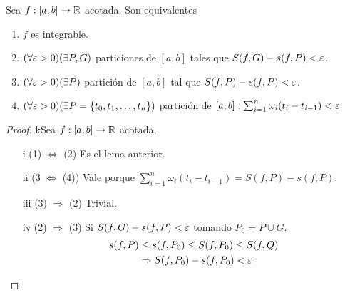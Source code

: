 \begin{theorem}
  Sea \(f: [a, b] \to \mathbb{R} \) acotada. Son equivalentes \begin{enumerate}
    \item \(f\) es integrable.
    \item \((\forall \varepsilon > 0)(\exists P, G)\) particiones de \([a, b]\) tales que \(S(f, G) - s(f, P) < \varepsilon \).
    \item \((\forall \varepsilon > 0)(\exists P)\) partición de \([a, b]\) tal que \(S(f, P) - s(f, P) < \varepsilon \).
    \item \((\forall \varepsilon > 0)(\exists P = \{ t_0, t_1, \ldots, t_n \})\) partición de \([a, b] : \sum_{i = 1}^n \omega_i (t_i - t_{i-1}) < \varepsilon \)
  \end{enumerate}

  \begin{proof}
    kSea \(f: [a,b] \to \mathbb{R} \) acotada,
    \begin{enumerate}
      \item[i] (1) \(\iff \) (2) Es el lema anterior.
      \item[ii] (3 \(\iff \) (4)) Vale porque \(\sum_{i = 1}^n \omega_i (t_i - t_{i-1}) = S(f, P) - s(f, P)\).
      \item[iii] (3) \(\Rightarrow \) (2) Trivial.
      \item[iv] (2) \(\Rightarrow \) (3) Si \(S(f, G) - s(f, P) < \varepsilon \) tomando \(P_0 = P \cup G\).\begin{align*}
              s(f, P) & \leq s(f, P_0) \leq S(f, P_0) \leq S(f, Q) \\
                      & \Rightarrow S(f, P_0) - s(f, P_0) < \varepsilon
            \end{align*}
    \end{enumerate}
  \end{proof}
\end{theorem}

